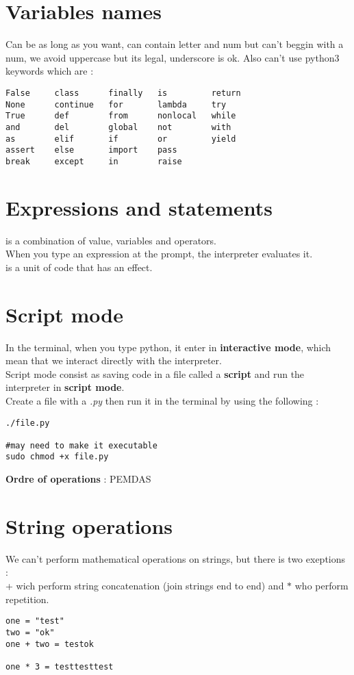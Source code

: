 \documentclass{report}
\begin{document}
\section{Variables names}
Can be as long as you want, can contain letter and num but  can't beggin
with a num, we avoid uppercase but its legal, underscore is ok. Also 
can't use python3 keywords which are : 
\begin{verbatim}
False     class      finally   is         return
None      continue   for       lambda     try
True      def        from      nonlocal   while
and       del        global    not        with
as        elif       if        or         yield
assert    else       import    pass
break     except     in        raise
\end{verbatim}

\section{Expressions and statements}
 is a combination of value, variables and operators.\\
When you type an expression at the prompt, the interpreter evaluates it.\\
 is a unit of code that has an effect.

\section{Script mode}
In the terminal, when you type python, it enter in 
\textbf{interactive mode}, which mean that we interact directly with the interpreter.\\
Script mode consist as saving code in a file called a \textbf{script} and run 
the interpreter in \textbf{script mode}.\\

Create a file with a \textit{.py} then run it in the terminal
by using the following : 
\begin{verbatim}
./file.py

#may need to make it executable 
sudo chmod +x file.py
\end{verbatim}

\textbf{Ordre of operations} : PEMDAS

\section{String operations}
We can't perform mathematical operations on strings, but there is two exeptions : \\
+ wich perform string concatenation (join strings end to end) and $\ast$ who 
perform repetition. 
\begin{verbatim}
one = "test"
two = "ok"
one + two = testok

one * 3 = testtesttest
\end{verbatim}
\end{document}
